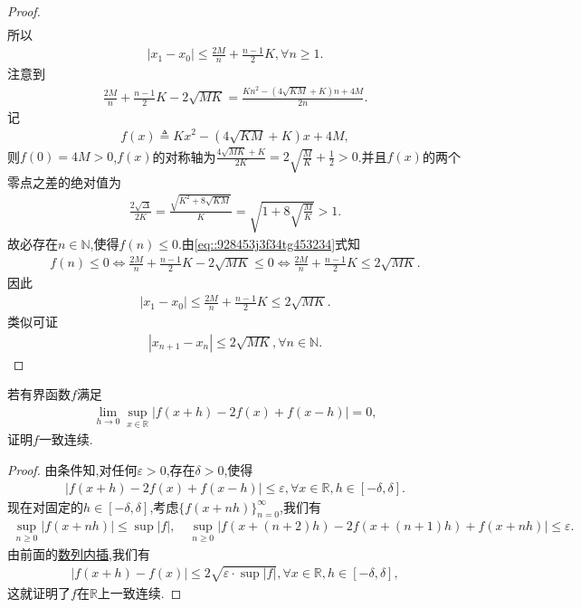 \documentclass[../../main.tex]{subfiles}
\begin{document}
\begin{proof}
\begin{align*}
\end{align*}
所以
\begin{align*}
|x_1 - x_0| \leqslant \frac{2M}{n} + \frac{n-1}{2}K, \forall n \geqslant 1.
\end{align*}
注意到
\begin{align}
\frac{2M}{n} + \frac{n-1}{2}K - 2\sqrt{MK} = \frac{Kn^2 - (4\sqrt{KM} + K)n + 4M}{2n}. \label{eq::928453j3f34tg453234}
\end{align}
记
\begin{align*}
f(x) \triangleq Kx^2 - (4\sqrt{KM} + K)x + 4M,
\end{align*}
则$f(0) = 4M > 0$,$f(x)$的对称轴为$\frac{4\sqrt{MK} + K}{2K} = 2\sqrt{\frac{M}{K}} + \frac{1}{2} > 0$.并且$f(x)$的两个零点之差的绝对值为
\begin{align*}
\frac{2\sqrt{\Delta}}{2K} = \frac{\sqrt{K^2 + 8\sqrt{KM}}}{K} = \sqrt{1 + 8\sqrt{\frac{M}{K}}} > 1.
\end{align*}
故必存在$n \in \mathbb{N}$,使得$f(n) \leqslant 0$.由\eqref{eq::928453j3f34tg453234}式知
\begin{align*}
f(n) \leqslant 0 \Longleftrightarrow \frac{2M}{n} + \frac{n-1}{2}K - 2\sqrt{MK} \leqslant 0 \Longleftrightarrow \frac{2M}{n} + \frac{n-1}{2}K \leqslant 2\sqrt{MK}.
\end{align*}
因此
\begin{align*}
|x_1 - x_0| \leqslant \frac{2M}{n} + \frac{n-1}{2}K \leqslant 2\sqrt{MK}.
\end{align*}
类似可证
\begin{align*}
|x_{n+1} - x_n| \leqslant 2\sqrt{MK}, \forall n \in \mathbb{N}.
\end{align*}

\end{proof}

\begin{example}
若有界函数$f$满足
\begin{align*}
\lim_{h \to 0} \sup_{x \in \mathbb{R}} |f(x + h) - 2f(x) + f(x - h)| = 0,
\end{align*}
证明$f$一致连续.
\end{example}
\begin{proof}
由条件知,对任何$\varepsilon > 0$,存在$\delta > 0$,使得
\begin{align*}
|f(x + h) - 2f(x) + f(x - h)| \leqslant \varepsilon, \forall x \in \mathbb{R}, h \in [-\delta, \delta].
\end{align*}
现在对固定的$h \in [-\delta, \delta]$,考虑$\{f(x + nh)\}_{n=0}^\infty$,我们有
\begin{align*}
\sup_{n \geqslant 0} |f(x + nh)| \leqslant \sup |f|,\quad \sup_{n \geqslant 0} |f(x + (n + 2)h) - 2f(x + (n + 1)h) + f(x + nh)| \leqslant \varepsilon.
\end{align*}
由前面的\hyperref[proposition:数列内插]{数列内插},我们有
\begin{align*}
|f(x + h) - f(x)| \leqslant 2\sqrt{\varepsilon \cdot \sup |f|}, \forall x \in \mathbb{R}, h \in [-\delta, \delta],
\end{align*}
这就证明了$f$在$\mathbb{R}$上一致连续.

\end{proof}
\end{document}
